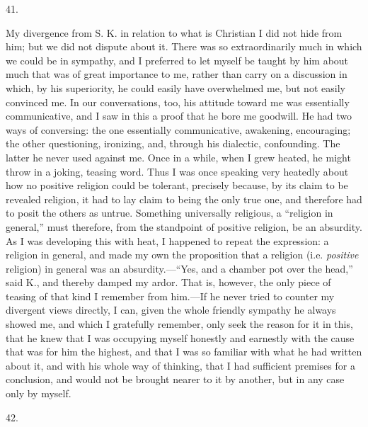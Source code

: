 \documentclass[12pt,a4paper,openany]{book}
\newcommand{\secnum}[1]{\par\begin{center}#1\end{center}\par\nobreak}
\newcommand{\opage}[1]{\marginnote{\footnotesize\textit{[#1]}}}
\begin{document}
\secnum{41.}

My divergence from S. K. in relation to what is Christian
I did not hide from him; but we did not dispute
about it. There was so extraordinarily much in which we
could be in sympathy, and I preferred to let myself be taught
by him about much that was of great importance to me,
rather than carry on a discussion in which, by his superiority,
he could easily have overwhelmed me, but not
easily convinced me. In our conversations, too, his attitude toward me
was essentially communicative, and I saw in this a
proof that he bore me goodwill. He had
two ways of conversing: the one essentially communicative,
awakening, encouraging; the other questioning,
ironizing, and, through his dialectic, confounding.
The latter he never used against me.
Once in a while, when I grew heated, he might throw in a
joking, teasing word. Thus I was once speaking
very heatedly about how no positive religion could be
tolerant, precisely because, by its claim to be
revealed religion, it had to lay claim to being
the only true one, and therefore had to posit the others as
untrue. Something universally religious, a ``religion in general,''
must therefore, from the standpoint of positive religion, be
an absurdity. As I was developing this with heat, I happened
to repeat the expression: a religion in general,
and made my own the proposition that a religion (i.e.
\emph{positive} religion) in general was an absurdity.---``Yes, and
a chamber pot over the head,'' said K., and thereby damped
my ardor. That is, however, the only piece of teasing of
that kind I remember from him.---If he never tried
to counter my divergent views directly,
I can, given the whole friendly sympathy he always showed
me, and which I gratefully remember, only seek the reason
\opage{367}for it in this, that he knew that I was occupying myself honestly and
earnestly with the cause that was for him the highest, and that I was so
familiar with what he had written about it, and with his whole way of
thinking, that I had sufficient premises for a conclusion, and would not be
brought nearer to it by another, but in any case only by myself.

\secnum{42.}
\end{document}
